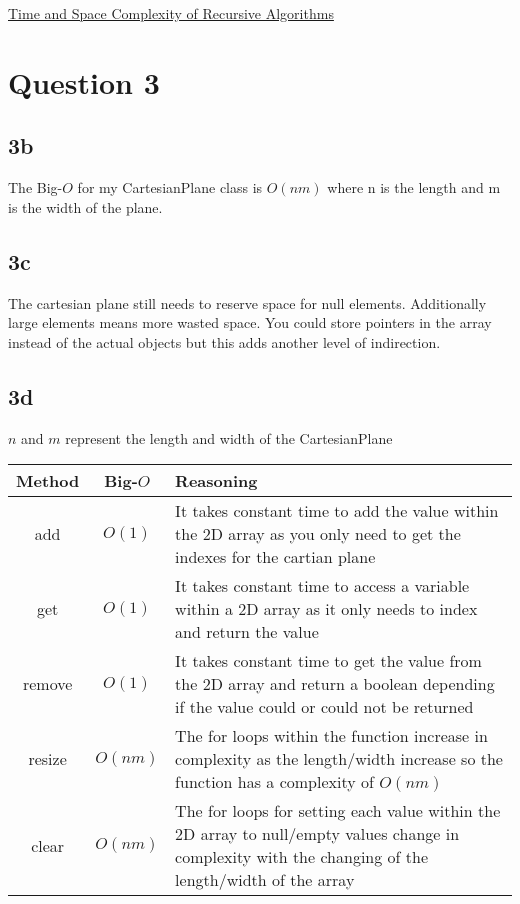 \documentclass[oneside, a4paper]{article}
\begin{document}
\href{https://www.ideserve.co.in/learn/time-and-space-complexity-of-recursive-algorithms}{Time and Space Complexity of Recursive Algorithms}

\newpage
\setcounter{secnumdepth}{-1}
\section{Question 3}
\subsection{3b}
The Big-$O$ for my CartesianPlane class is $O(nm)$ where n is the length and m is the width of the plane.

\subsection{3c}
The cartesian plane still needs to reserve space for null elements. Additionally large elements means more wasted space. You could store pointers in the array instead of the actual objects but this adds another level of indirection.

\subsection{3d}
$n$ and $m$ represent the length and width of the CartesianPlane

\begin{tabular}{|c c p{}|} 
    \hline
    Method & Big-$O$ & Reasoning \\ [0.5ex] 
    \hline
    add & $O(1)$ & It takes constant time to add the value within the 2D array as you only need to get the indexes for the cartian plane \\ 
    \hline
    get & $O(1)$ & It takes constant time to access a variable within a 2D array as it only needs to index and return the value \\
    \hline
    remove & $O(1)$ &  It takes constant time to get the value from the 2D array and return a boolean depending if the value could or could not be returned \\
    \hline
    resize & $O(nm)$ & The for loops within the function increase in complexity as the length/width increase so the function has a complexity of $O(nm)$\\
    \hline
    clear & $O(nm)$ & The for loops for setting each value within the 2D array to null/empty values change in complexity with the changing of the length/width of the array \\ 
    \hline
\end{tabular}
\end{document}
